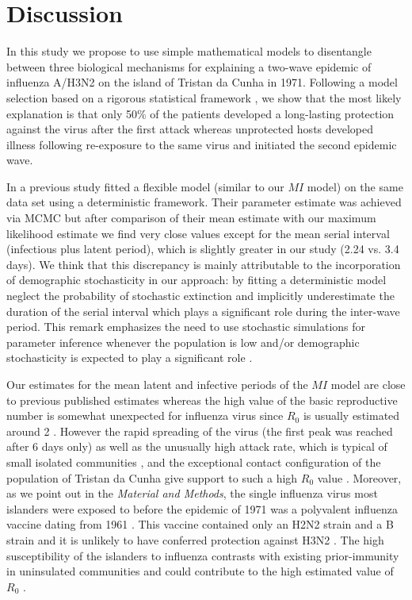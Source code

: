 \section{Discussion}

In this study we propose to use simple mathematical models to
disentangle between three biological mechanisms for explaining a
two-wave epidemic of influenza A/H3N2 on the island of Tristan da
Cunha in 1971. Following a model selection based on a rigorous
statistical framework \citep{Ionides2006}, we show that the most
likely explanation is that only 50\% of the patients developed a
long-lasting protection against the virus after the first attack
whereas unprotected hosts developed illness following re-exposure to
the same virus and initiated the second epidemic wave.

In a previous study \citet{Mathews2007} fitted a flexible model
(similar to our $MI$ model) on the same data set using a deterministic
framework. Their parameter estimate was achieved via MCMC but after
comparison of their mean estimate with our maximum likelihood estimate
we find very close values except for the mean serial interval
(infectious plus latent period), which is slightly greater in our
study (2.24 vs. 3.4 days). We think that this discrepancy is mainly
attributable to the incorporation of demographic stochasticity in our
approach: by fitting a deterministic model \citet{Mathews2007} neglect
the probability of stochastic extinction and implicitly underestimate
the duration of the serial interval which plays a significant role
during the inter-wave period. This remark emphasizes the need to use
stochastic simulations for parameter inference whenever the population
is low and/or demographic stochasticity is expected to play a
significant role \citep{Lloyd-Smith2005}.

Our estimates for the mean latent and infective periods of the $MI$
model are close to previous published estimates \citep{Cauchemez2004}
whereas the high value of the basic reproductive number is somewhat
unexpected for influenza virus since $R_{0}$ is usually estimated
around 2 \citep{Lessler2007}. However the rapid spreading of the virus
(the first peak was reached after 6 days only) as well as the
unusually high attack rate, which is typical of small isolated
communities \citep{Brown1966}, and the exceptional contact
configuration of the population of Tristan da Cunha
\citep{Samuels1963,Shibli1971} give support to such a high $R_{0}$
value \citep{Mathews2009}. Moreover, as we point out in the
\textsl{Material and Methods}, the single influenza virus most
islanders were exposed to before the epidemic of 1971 was a polyvalent
influenza vaccine dating from 1961 \citep{Tyrrell1967}. This vaccine
contained only an H2N2 strain and a B strain and it is unlikely to
have conferred protection against H3N2
\citep{Brown1969a,Brown1969b}. The high susceptibility of the
islanders to influenza contrasts with existing prior-immunity in
uninsulated communities and could contribute to the high estimated
value of $R_{0}$ \citep{McVernon2007,McCaw2009}.

